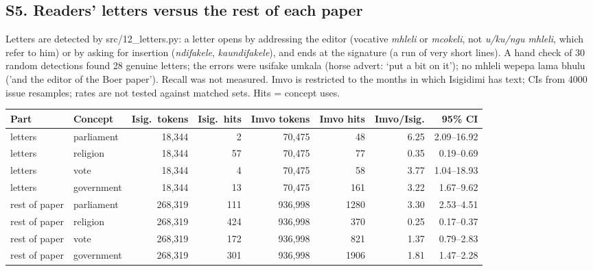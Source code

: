 \documentclass[10pt,letterpaper]{article}
\begin{document}
\subsection*{S5. Readers' letters versus the rest of each paper}
Letters are detected by src/12\_letters.py: a letter opens by addressing the editor (vocative \emph{mhleli} or \emph{mcokeli}, not \emph{u/ku/ngu mhleli}, which refer to him) or by asking for insertion (\emph{ndifakele}, \emph{kaundifakele}), and ends at the signature (a run of very short lines). A hand check of 30 random detections found 28 genuine letters; the errors were usifake umkala (horse advert: `put a bit on it'); no mhleli wepepa lama bhulu ('and the editor of the Boer paper'). Recall was not measured. Imvo is restricted to the months in which Isigidimi has text; CIs from 4000 issue resamples; rates are not tested against matched sets. Hits = concept uses.\\[2pt]
\begin{tabular}{@{}llrrrrrr@{}}
\toprule
Part & Concept & Isig.\ tokens & Isig.\ hits & Imvo tokens & Imvo hits & Imvo/Isig. & 95\% CI \\ \midrule
letters & parliament & 18,344 & 2 & 70,475 & 48 & 6.25 & 2.09--16.92 \\
letters & religion & 18,344 & 57 & 70,475 & 77 & 0.35 & 0.19--0.69 \\
letters & vote & 18,344 & 4 & 70,475 & 58 & 3.77 & 1.04--18.93 \\
letters & government & 18,344 & 13 & 70,475 & 161 & 3.22 & 1.67--9.62 \\
rest of paper & parliament & 268,319 & 111 & 936,998 & 1280 & 3.30 & 2.53--4.51 \\
rest of paper & religion & 268,319 & 424 & 936,998 & 370 & 0.25 & 0.17--0.37 \\
rest of paper & vote & 268,319 & 172 & 936,998 & 821 & 1.37 & 0.79--2.83 \\
rest of paper & government & 268,319 & 301 & 936,998 & 1906 & 1.81 & 1.47--2.28 \\
\bottomrule
\end{tabular}
\end{document}
